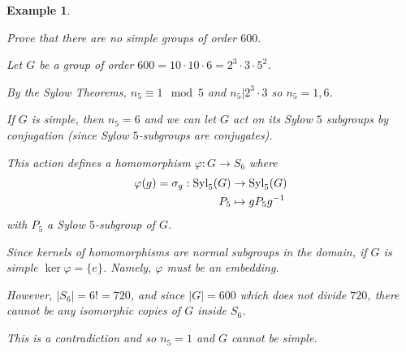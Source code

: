 \documentclass[12pt]{Qual}
\newtheorem{example}{Example}
\begin{document}
\vspace{0.25cm}
\begin{example}
$\,$
\begin{framed}
Prove that there are no simple groups of order $600.$
\end{framed}
Let $G$ be a group of order $600=10\cdot 10\cdot 6=2^3\cdot 3\cdot 5^2$.

By the Sylow Theorems, $n_5\equiv 1\mod5$ and $n_5|2^3\cdot 3$ so $n_5=1,6$.

If $G$ is simple, then $n_5=6$ and we can let $G$ act on its Sylow $5$ subgroups by conjugation (since Sylow $5$-subgroups are conjugates).

This action defines a homomorphism $\varphi:G\to S_6$ where \begin{align*}
    \varphi(g)=\sigma_g:\text{Syl}_5(G)&\to\text{Syl}_5(G)\\
    P_5&\mapsto gP_5g^{-1}
\end{align*} with $P_5$ a Sylow $5$-subgroup of $G$.

Since kernels of homomorphisms are normal subgroups in the domain, if $G$ is simple $\ker\varphi=\{e\}$. Namely, $\varphi$ must be an embedding.

However, $|S_6|=6!=720$, and since $|G|=600$ which does not divide $720$, there cannot be any isomorphic copies of $G$ inside $S_6$.

This is a contradiction and so $n_5=1$ and $G$ cannot be simple.
\end{example}
\end{document}
